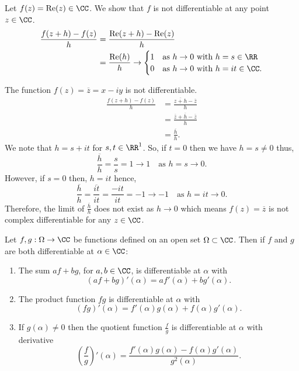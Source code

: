 \documentclass[12pt, a4paper]{article}
\DeclareMathOperator{\R}{Re}
\begin{document}
\begin{example}
    Let \(f(z) = \R(z) \in \CC\). We show that \(f\) is not differentiable at any point \(z \in \CC\).
    \[\begin{aligned}
        \frac{f(z+h)-f(z)}{h} &= \frac{\R(z+h)-\R(z)}{h} \\
        &= \frac{\R(h)}{h} \to \begin{cases}
            1 &\text{as } h \to 0 \text{ with } h=s \in \RR \\
            0 &\text{as } h \to 0 \text{ with } h=it \in \CC.
        \end{cases}
    \end{aligned}\]
\end{example}

\begin{mdexample}
    The function \(f(z)=\overline{z} = x-iy\) is not differentiable.
    \[\begin{aligned}
        \frac{f(z+h)-f(z)}{h} &= \frac{\overline{z+h}-\overline{z}}{h} \\
        &= \frac{\overline{z}+\overline{h}-\overline{z}}{h} \\
        &= \frac{\overline{h}}{h}.
    \end{aligned}\]
    We note that \(h = s+it\) for \(s,t \in \RR^1\). So, if \(t =0\) then we have \(h=s\neq 0\) thus,
    \[\frac{\overline{h}}{h}=\frac{s}{s} = 1 \to 1 \quad \text{as } h=s \to 0.\]
    However, if \(s = 0\) then, \(h=it\) hence,
    \[\frac{\overline{h}}{h} = \frac{\overline{it}}{it} = \frac{-it}{it} = -1 \to -1 \quad \text{as } h=it \to 0.\]
    Therefore, the limit of \(\frac{\overline{h}}{h}\) does not exist as \(h \to 0\) which means \(f(z)=\overline{z}\) is not complex differentiable for any \(z \in \CC\).
\end{mdexample}

\begin{proposition}
    Let \(f,g : \Omega \to \CC\) be functions defined on an open set \(\Omega \subset \CC\). Then if \(f\) and \(g\) are both differentiable at \(\alpha \in \CC\):
    \begin{enumerate}
        \item The sum \(a f + b g\), for \(a,b \in \CC\), is differentiable at \(\alpha\) with 
        \[(a f +b g)'(\alpha)=a f'(\alpha)+b g'(\alpha).\]
        \item The product function \(fg\) is differentiable at \(\alpha\) with 
        \[(fg)'(\alpha) = f'(\alpha)g(\alpha)+f(\alpha)g'(\alpha).\]
        \item If \(g(\alpha) \neq 0\) then the quotient function \(\frac{f}{g}\) is differentiable at \(\alpha\) with derivative 
        \[\left( \frac{f}{g} \right)'(\alpha) = \frac{f'(\alpha)g(\alpha)-f(\alpha)g'(\alpha)}{g^2(\alpha)}.\]
    \end{enumerate}
\end{proposition}
\end{document}
